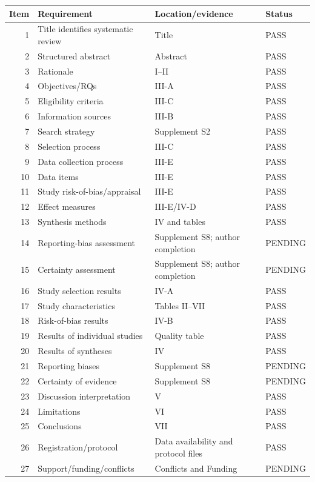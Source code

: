 \documentclass[
  journal,
  10pt]{IEEEtran}
\newcounter{none} %
\begin{document}
{\def\LTcaptype{none} %
\begin{tabularx}{\columnwidth}{@{}rXXl@{}}
\toprule
Item & Requirement & Location/evidence & Status \\
\midrule

\bottomrule

1 & Title identifies systematic review & Title & PASS \\
2 & Structured abstract & Abstract & PASS \\
3 & Rationale & I--II & PASS \\
4 & Objectives/RQs & III-A & PASS \\
5 & Eligibility criteria & III-C & PASS \\
6 & Information sources & III-B & PASS \\
7 & Search strategy & Supplement S2 & PASS \\
8 & Selection process & III-C & PASS \\
9 & Data collection process & III-E & PASS \\
10 & Data items & III-E & PASS \\
11 & Study risk-of-bias/appraisal & III-E & PASS \\
12 & Effect measures & III-E/IV-D & PASS \\
13 & Synthesis methods & IV and tables & PASS \\
14 & Reporting-bias assessment & Supplement S8; author completion &
PENDING \\
15 & Certainty assessment & Supplement S8; author completion &
PENDING \\
16 & Study selection results & IV-A & PASS \\
17 & Study characteristics & Tables II--VII & PASS \\
18 & Risk-of-bias results & IV-B & PASS \\
19 & Results of individual studies & Quality table & PASS \\
20 & Results of syntheses & IV & PASS \\
21 & Reporting biases & Supplement S8 & PENDING \\
22 & Certainty of evidence & Supplement S8 & PENDING \\
23 & Discussion interpretation & V & PASS \\
24 & Limitations & VI & PASS \\
25 & Conclusions & VII & PASS \\
26 & Registration/protocol & Data availability and protocol files &
PASS \\
27 & Support/funding/conflicts & Conflicts and Funding & PENDING \\
\end{tabularx}
}
\end{document}
